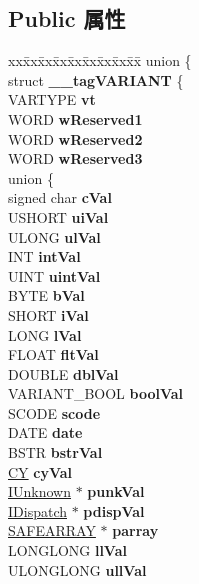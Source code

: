 \subsection*{Public 属性}
\begin{DoxyCompactItemize}
\item 
\mbox{\label{structtag_v_a_r_i_a_n_t_a1c327a26ef1ec1ff1a8a0b60044b2dc2}} 
\begin{tabbing}
xx\=xx\=xx\=xx\=xx\=xx\=xx\=xx\=xx\=\kill
union \{\\
\>struct {\bfseries \_\_tagVARIANT} \{\\
\>\>VARTYPE {\bfseries vt}\\
\>\>WORD {\bfseries wReserved1}\\
\>\>WORD {\bfseries wReserved2}\\
\>\>WORD {\bfseries wReserved3}\\
\>\>union \{\\
\>\>\>signed char {\bfseries cVal}\\
\>\>\>USHORT {\bfseries uiVal}\\
\>\>\>ULONG {\bfseries ulVal}\\
\>\>\>INT {\bfseries intVal}\\
\>\>\>UINT {\bfseries uintVal}\\
\>\>\>BYTE {\bfseries bVal}\\
\>\>\>SHORT {\bfseries iVal}\\
\>\>\>LONG {\bfseries lVal}\\
\>\>\>FLOAT {\bfseries fltVal}\\
\>\>\>DOUBLE {\bfseries dblVal}\\
\>\>\>VARIANT\_BOOL {\bfseries boolVal}\\
\>\>\>SCODE {\bfseries scode}\\
\>\>\>DATE {\bfseries date}\\
\>\>\>BSTR {\bfseries bstrVal}\\
\>\>\>\hyperlink{uniontag_c_y}{CY} {\bfseries cyVal}\\
\>\>\>\hyperlink{interface_i_unknown}{IUnknown} $\ast$ {\bfseries punkVal}\\
\>\>\>\hyperlink{interface_i_dispatch}{IDispatch} $\ast$ {\bfseries pdispVal}\\
\>\>\>\hyperlink{structtag_s_a_f_e_a_r_r_a_y}{SAFEARRAY} $\ast$ {\bfseries parray}\\
\>\>\>LONGLONG {\bfseries llVal}\\
\>\>\>ULONGLONG {\bfseries ullVal}\\

\end{tabbing}
\end{DoxyCompactItemize}

